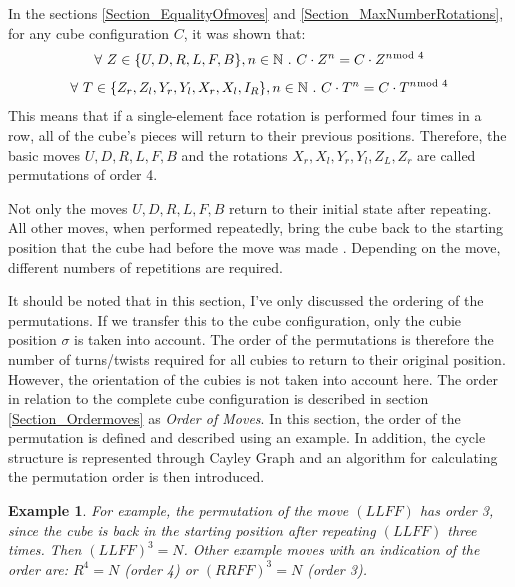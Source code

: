 \documentclass[12pt,a4paper]{article}
\theoremstyle{custom}
\newtheorem*{example}{Example}
\begin{document}
\label{Section_OrderPermutations}
In the sections \ref{Section_EqualityOfmoves} and \ref{Section_MaxNumberRotations}, for any cube configuration $C$, it was shown that:
\begin{align*}
\forall \ Z \in \{ U, D, R, L, F, B \}, n \in \mathbb{N} \ . \ C \cdot Z^n=C \cdot Z^{n \hspace*{-0.5em} \mod 4}
\end{align*}
\vspace*{-3em}
\begin{align*}
\forall \ T \in \{{Z_r}, {Z_l}, {Y_r}, {Y_l}, {X_r}, {X_l}, I_R \}, n \in \mathbb{N} \ . \ C \cdot T^n=C \cdot T^{n \hspace*{-0.5em} \mod 4}
\end{align*}
This means that if a single-element face rotation is performed four times in a row, all of the cube's pieces will return to their previous positions. Therefore, the basic moves $U, D, R, L, F, B$ and the rotations $X_r, X_l, Y_r, Y_l, Z_L, Z_r$ are called permutations of order 4.

Not only the moves $U, D, R, L, F, B$ return to their initial state after repeating. All other moves, when performed repeatedly, bring the cube back to the starting position that the cube had before the move was made \cite{TD}. Depending on the move, different numbers of repetitions are required.


It should be noted that in this section, I've only discussed the ordering of the permutations. If we transfer this to the cube configuration, only the cubie position $\sigma$ is taken into account. The order of the permutations is therefore the number of turns/twists required for all cubies to return to their original position. However, the orientation of the cubies is not taken into account here. The order in relation to the complete cube configuration is described in section \ref{Section_Ordermoves} as \textit{Order of Moves}. In this section, the order of the permutation is defined and described using an example. In addition, the cycle structure is represented through Cayley Graph and an algorithm for calculating the permutation order is then introduced.


\begin{example}

For example, the permutation of the move $(LLFF)$ has order 3, since the cube is back in the starting position after repeating $(LLFF)$ three times. Then $(LLFF)^3 = N$.
Other example moves with an indication of the order are: ${R^4= N}$ (order 4) or ${(RRFF)^3 = N}$ (order 3).
\end{example}
\end{document}
